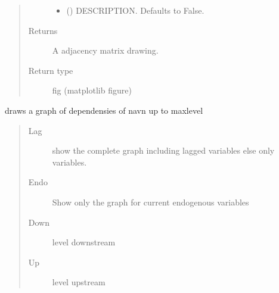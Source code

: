 \documentclass[letterpaper,10pt,english]{sphinxmanual}
\begin{document}
\begin{fulllineitems}
\begin{fulllineitems}
\begin{quote}
\begin{description}
\begin{itemize}
\item {} 
\sphinxAtStartPar
{} (\sphinxstyleliteralemphasis{\sphinxupquote{, }}) \textendash{} DESCRIPTION. Defaults to False.

\end{itemize}

\item[{Returns}] \leavevmode
\sphinxAtStartPar
A adjacency matrix drawing.

\item[{Return type}] \leavevmode
\sphinxAtStartPar
fig (matplotlib figure)

\end{description}\end{quote}

\end{fulllineitems}


\begin{fulllineitems}
\label{\detokenize{core/modelclass:modelclass.Graph_Draw_Mixin.draw}}
\pysigstartsignatures
{}
\pysigstopsignatures
\sphinxAtStartPar
draws a graph of dependensies of navn up to maxlevel
\begin{quote}\begin{description}
\item[{Lag}] \leavevmode
\sphinxAtStartPar
show the complete graph including lagged variables else only variables.

\item[{Endo}] \leavevmode
\sphinxAtStartPar
Show only the graph for current endogenous variables

\item[{Down}] \leavevmode
\sphinxAtStartPar
level downstream

\item[{Up}] \leavevmode
\sphinxAtStartPar
level upstream


\end{description}
\end{quote}
\end{fulllineitems}
\end{fulllineitems}
\end{document}
